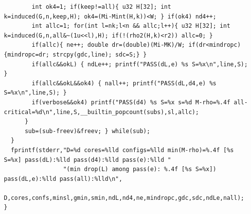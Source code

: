 \documentclass[11pt]{amsart}
\theoremstyle{definition}
\begin{document}
\begin{lstlisting}
        int ok4=1; if(keep!=all){ u32 H[32]; int k=induced(G,n,keep,H); ok4=(Mi-Mint(H,k))<W; } if(ok4) nd4++;
        int allc=1; for(int l=nk;l<n && allc;l++){ u32 H[32]; int k=induced(G,n,all&~(1u<<l),H); if(!(rho2(H,k)<r2)) allc=0; }
        if(allc){ ne++; double dr=(double)(Mi-MK)/W; if(dr<mindropc){mindropc=dr; strcpy(gdc,line); sdc=S;} }
        if(allc&&okL) { ndLe++; printf("PASS(dL,e) %s S=%x\n",line,S); }
        if(allc&&okL&&ok4) { nall++; printf("PASS(dL,d4,e) %s S=%x\n",line,S); }
        if(verbose&&ok4) printf("PASS(d4) %s S=%x s=%d M-rho=%.4f all-critical=%d\n",line,S,__builtin_popcount(subs),sl,allc);
      }
      sub=(sub-freev)&freev; } while(sub);
  }
  fprintf(stderr,"D=%d cores=%lld configs=%lld min(M-rho)=%.4f [%s S=%x] pass(dL):%lld pass(d4):%lld pass(e):%lld "
                 "(min drop(L) among pass(e): %.4f [%s S=%x]) pass(dL,e):%lld pass(all):%lld\n",
          D,cores,confs,minsl,gmin,smin,ndL,nd4,ne,mindropc,gdc,sdc,ndLe,nall);
}
\end{lstlisting}
\end{document}
